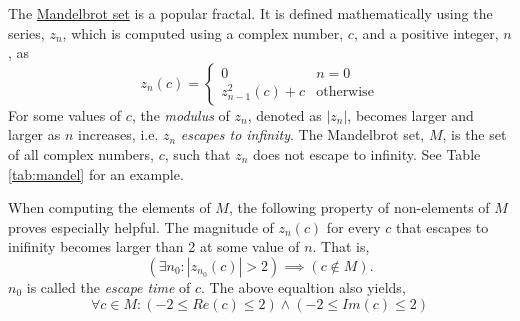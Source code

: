 \documentclass[addpoints]{exam}
\begin{document}
\begin{questions}
The \href{https://en.wikipedia.org/wiki/Mandelbrot_set}{Mandelbrot set} is a popular fractal. It is defined mathematically using the series, $z_n$, which is computed using a complex number, $c$, and a positive integer, $n$, as
\[
  z_n(c) = \begin{cases}
    0 & n=0\\
    z_{n-1}^2(c)+c & \textrm{otherwise}
  \end{cases}
\]
For some values of $c$, the {\it modulus} of $z_n$, denoted as $|z_n|$, becomes larger and larger as $n$ increases, i.e. $z_n$ {\it escapes to infinity}. The Mandelbrot set, $M$, is the set of all complex numbers, $c$, such that $z_n$ does not escape to infinity. See Table \ref{tab:mandel} for an example.

When computing the elements of $M$, the following property of non-elements of $M$ proves especially helpful. The magnitude of $z_n(c)$ for every $c$ that escapes to inifinity becomes larger than 2 at some value of $n$. That is,
\[
  (\exists n_0: |z_{n_0}(c)| > 2) \implies (c \not\in M).
\]
$n_0$ is called the {\it escape time} of $c$.
The above equaltion also yields,
\[
  \forall c\in M: (-2\leq Re(c)\leq 2) \land (-2\leq Im(c)\leq 2)
\]
\end{questions}
\end{document}
